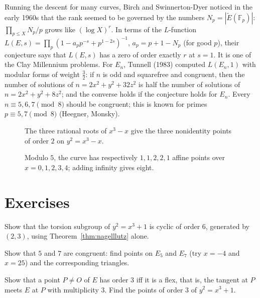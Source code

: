 \begin{remark}
Running the descent for many curves, Birch and Swinnerton-Dyer noticed in the early 1960s that the rank seemed to be governed by the numbers $N_p=|\tilde E(\mathbb F_p)|$:
$\prod_{p\le X}N_p/p$ grows like $(\log X)^r$. In terms of the $L$-function $L(E,s)=\prod_p(1-a_pp^{-s}+p^{1-2s})^{-1}$, $a_p=p+1-N_p$ (for good $p$), their conjecture
says that $L(E,s)$ has a zero of order exactly $r$ at $s=1$. It is one of the Clay Millennium problems. For $E_n$, Tunnell (1983) computed $L(E_n,1)$ with modular forms
of weight $\frac32$: if $n$ is odd and squarefree and congruent, then the number of solutions of $n=2x^2+y^2+32z^2$ is half the number of solutions of $n=2x^2+y^2+8z^2$; and
the converse holds if the conjecture holds for $E_n$. Every $n\equiv5,6,7\pmod8$ should be congruent; this is known for primes $p\equiv5,7\pmod8$ (Heegner, Monsky).
\end{remark}

\begin{figure}[ht]
\centering
{}
\caption{The three rational roots of $x^3-x$ give the three nonidentity points of order $2$ on $y^2=x^3-x$.}
\label{fig:v13-extra-15-a}
\end{figure}

\begin{figure}[ht]
\centering
{}
\caption{Modulo $5$, the curve has respectively $1,1,2,2,1$ affine points over $x=0,1,2,3,4$; adding infinity gives eight.}
\label{fig:v13-extra-15-b}
\end{figure}

\section{Exercises}

\begin{exercise}[$\star$]\label{ex:x3plus1}
Show that the torsion subgroup of $y^2=x^3+1$ is cyclic of order $6$, generated by $(2,3)$, using Theorem~\ref{thm:nagelllutz} alone.
\end{exercise}

\begin{exercise}[$\star$]\label{ex:five}
Show that $5$ and $7$ are congruent: find points on $E_5$ and $E_7$ (try $x=-4$ and $x=25$) and the corresponding triangles.
\end{exercise}

\begin{exercise}[$\star\star$]\label{ex:flex}
Show that a point $P\ne O$ of $E$ has order $3$ iff it is a flex, that is, the tangent at $P$ meets $E$ at $P$ with multiplicity $3$. Find the points of order $3$ of
$y^2=x^3+1$.
\end{exercise}

